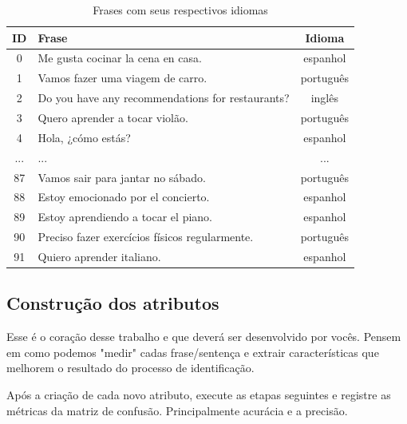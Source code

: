 \begin{table}[H]
\centering
\begin{tabular}{|c|p{9cm}|c|}
\hline
\textbf{ID} & \textbf{Frase} & \textbf{Idioma} \\
\hline
0 & Me gusta cocinar la cena en casa. & espanhol \\
1 & Vamos fazer uma viagem de carro. & português \\
2 & Do you have any recommendations for restaurants? & inglês \\
3 & Quero aprender a tocar violão. & português \\
4 & Hola, ¿cómo estás? & espanhol \\
\hline
... & ... & ... \\
\hline
87 & Vamos sair para jantar no sábado. & português \\
88 & Estoy emocionado por el concierto. & espanhol \\
89 & Estoy aprendiendo a tocar el piano. & espanhol \\
90 & Preciso fazer exercícios físicos regularmente. & português \\
91 & Quiero aprender italiano. & espanhol \\
\hline
\end{tabular}
\vspace{0.5em}
\caption{Frases com seus respectivos idiomas}
\label{tab:frases_idiomas}
\end{table}


\subsection*{\textbf{Construção dos atributos}}

Esse é o coração desse trabalho e que deverá ser desenvolvido por vocês. Pensem em como podemos "medir" cadas frase/sentença e extrair características que melhorem o resultado do processo de identificação.


Após a criação de cada novo atributo, execute as etapas seguintes e registre as métricas da matriz de confusão. Principalmente acurácia e a precisão.


